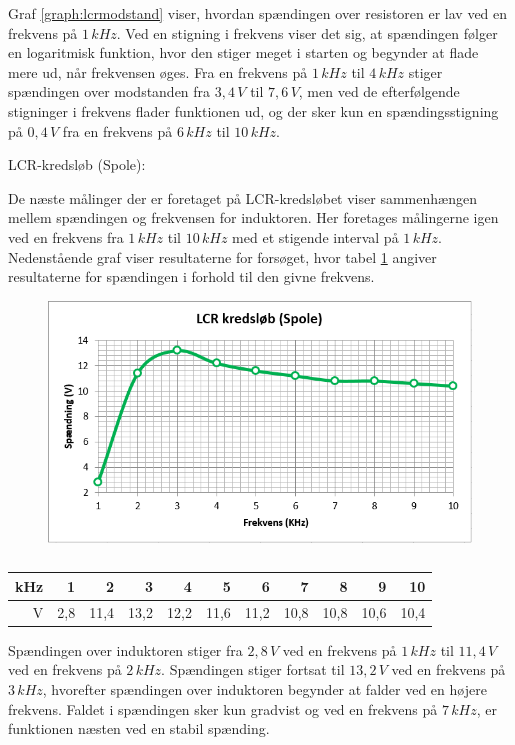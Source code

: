 Graf \ref{graph:lcrmodstand} viser, hvordan spændingen over resistoren er lav ved en frekvens på $1\, kHz$. Ved en stigning i frekvens viser det sig, at spændingen følger en logaritmisk funktion, hvor den stiger meget i starten og begynder at flade mere ud, når frekvensen øges. Fra en frekvens på $1\, kHz$ til $4\, kHz$ stiger spændingen over modstanden fra $3,4\, V$ til $7,6\, V$, men ved de efterfølgende stigninger i frekvens flader funktionen ud, og der sker kun en spændingsstigning på $0,4\, V$ fra en frekvens på $6\, kHz$ til $10\, kHz$.

LCR-kredsløb (Spole):

De næste målinger der er foretaget på LCR-kredsløbet viser sammenhængen mellem spændingen og frekvensen for induktoren. Her foretages målingerne igen ved en frekvens fra $1\, kHz$ til $10\, kHz$ med et stigende interval på $1\, kHz$. Nedenstående graf viser resultaterne for forsøget, hvor tabel \ref{tabular:lcrspole} angiver resultaterne for spændingen i forhold til den givne frekvens.

\begin{figure}[H]
\includegraphics[scale=1]{Setup/Graf6}
\caption{}
\label{graph:lcrspole}
\end{figure}

\begin{table}[H]
\centering
\begin{tabular}{|r|r|r|r|r|r|r|r|r|r|r|} \hline
kHz & 1 & 2 & 3 & 4 & 5 & 6 & 7 & 8 & 9 & 10 \\ \hline
V & 2,8 & 11,4 & 13,2 & 12,2 & 11,6 & 11,2 & 10,8 & 10,8 & 10,6 & 10,4 \\ \hline
\end{tabular}
\caption{}
\label{tabular:lcrspole}
\end{table}

Spændingen over induktoren stiger fra $2,8\, V$ ved en frekvens på $1\, kHz$ til $11,4\, V$ ved en frekvens på $2\, kHz$. Spændingen stiger fortsat til $13,2\, V$ ved en frekvens på $3\, kHz$, hvorefter spændingen over induktoren begynder at falder ved en højere frekvens. Faldet i spændingen sker kun gradvist og ved en frekvens på $7\, kHz$, er funktionen næsten ved en stabil spænding.

